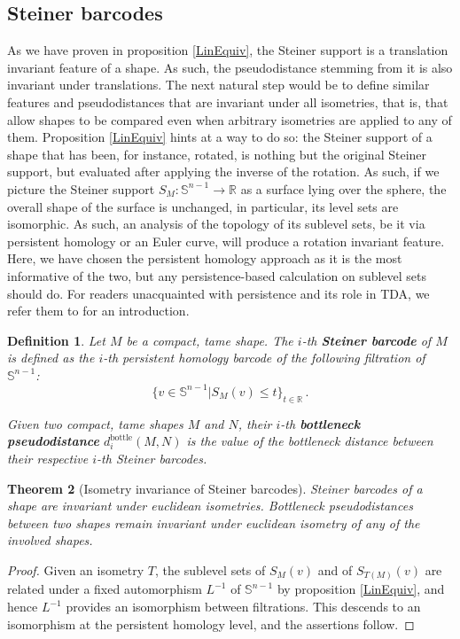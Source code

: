 \documentclass[a4paper]{article}
\newtheorem{theorem}{Theorem}[section]
\newtheorem{definition}[theorem]{Definition}
\newcommand{\bb}{\mathbb}
\newcommand{\dbottle}{{d_i^{\operatorname{bottle}}}}
\begin{document}
\subsection{Steiner barcodes}
As we have proven in proposition \ref{LinEquiv}, the Steiner support is a translation invariant feature of a shape. As such, the pseudodistance stemming from it is also invariant under translations. The next natural step would be to define similar features and pseudodistances that are invariant under all isometries, that is, that allow shapes to be compared even when arbitrary isometries are applied to any of them. Proposition \ref{LinEquiv} hints at a way to do so: the Steiner support of a shape that has been, for instance, rotated, is nothing but the original Steiner support, but evaluated after applying the inverse of the rotation. As such, if we picture the Steiner support $S_M: \bb S^{n-1} \to \bb R$ as a surface lying over the sphere, the overall shape of the surface is unchanged, in particular, its level sets are isomorphic. As such, an analysis of the topology of its sublevel sets, be it via persistent homology or an Euler curve, will produce a rotation invariant feature. Here, we have chosen the persistent homology approach as it is the most informative of the two, but any persistence-based calculation on sublevel sets should do. For readers unacquainted with persistence and its role in TDA, we refer them to \cite{oudot2015persistence} for an introduction.

\begin{definition}
	\label{DefBarcodes}
	Let $M$ be a compact, tame shape. The $i$-th \textbf{Steiner barcode} of $M$ is defined as the $i$-th persistent homology barcode of the following filtration of $\bb S^{n-1}$:
	$$\{ v \in \bb S^{n-1} | S_M(v) \leq t \}_{t \in \bb R} \, .$$
	
	Given two compact, tame shapes $M$ and $N$, their $i$-th \textbf{bottleneck pseudodistance} $\dbottle(M,N)$ is the value of the bottleneck distance between their respective $i$-th Steiner barcodes.
\end{definition}


\begin{theorem}[Isometry invariance of Steiner barcodes]
	\label{BarcodesInvariance}
	Steiner barcodes of a shape are invariant under euclidean isometries. Bottleneck pseudodistances between two shapes remain invariant under euclidean isometry of any of the involved shapes.
\end{theorem}

\begin{proof}
	Given an isometry $T$, the sublevel sets of $S_M(v)$ and of $S_{T(M)}(v)$ are related under a fixed automorphism $L^{-1}$ of $\bb S^{n-1}$ by proposition \ref{LinEquiv}, and hence $L^{-1}$ provides an isomorphism between filtrations. This descends to an isomorphism at the persistent homology level, and the assertions follow.
\end{proof}
\end{document}
